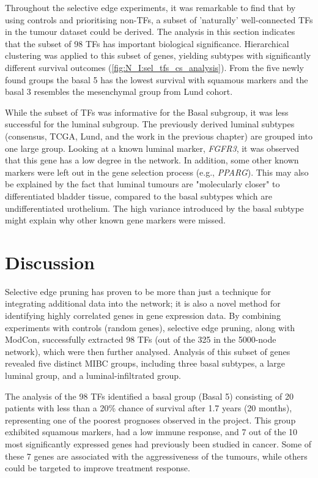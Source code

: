 Throughout the selective edge experiments, it was remarkable to find that by using controls and prioritising non-TFs, a subset of 'naturally' well-connected TFs in the tumour dataset could be derived. The analysis in this section indicates that the subset of 98 TFs has important biological significance. Hierarchical clustering was applied to this subset of genes, yielding subtypes with significantly different survival outcomes (\cref{fig:N_I:sel_tfs_cs_analysis}).  From the five newly found groups the basal 5 has the lowest survival with squamous markers and the basal 3 resembles the mesenchymal group from Lund cohort.

While the subset of TFs was informative for the Basal subgroup, it was less successful for the luminal subgroup. The previously derived luminal subtypes (consensus, TCGA, Lund, and the work in the previous chapter) are grouped into one large group. Looking at a known luminal marker, \textit{FGFR3}, it was observed that this gene has a low degree in the network. In addition, some other known markers were left out in the gene selection process (e.g., \textit{PPARG}). This may also be explained by the fact that luminal tumours are "molecularly closer" to differentiated bladder tissue, compared to the basal subtypes which are undifferentiated urothelium. The high variance introduced by the basal subtype might explain why other known gene markers were missed.

\section{Discussion}

Selective edge pruning has proven to be more than just a technique for integrating additional data into the network; it is also a novel method for identifying highly correlated genes in gene expression data. By combining experiments with controls (random genes), selective edge pruning, along with ModCon, successfully extracted 98 TFs (out of the 325 in the 5000-node network), which were then further analysed. Analysis of this subset of genes revealed five distinct MIBC groups, including three basal subtypes, a large luminal group, and a luminal-infiltrated group.

The analysis of the 98 TFs identified a basal group (Basal 5) consisting of 20 patients with less than a 20\% chance of survival after 1.7 years (20 months), representing one of the poorest prognoses observed in the project. This group exhibited squamous markers, had a low immune response, and 7 out of the 10 most significantly expressed genes had previously been studied in cancer. Some of these 7 genes are associated with the aggressiveness of the tumours, while others could be targeted to improve treatment response.

